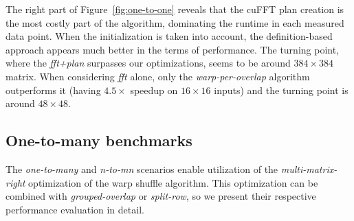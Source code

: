 

The right part of Figure~\ref{fig:one-to-one} reveals that the cuFFT plan creation is the most costly part of the algorithm, dominating the runtime in each measured data point. When the initialization is taken into account, the definition-based approach appears much better in the terms of performance. The turning point, where the \emph{fft+plan} surpasses our optimizations, seems to be around $384\times 384$ matrix. When considering \emph{fft} alone, only the \emph{warp-per-overlap} algorithm outperforms it (having $4.5\times$ speedup on $16\times 16$ inputs) and the turning point is around $48\times 48$.


\subsection{One-to-many benchmarks}

The \emph{one-to-many} and \emph{n-to-mn} scenarios enable utilization of the \emph{multi-matrix-right} optimization of the warp shuffle algorithm. This optimization can be combined with \emph{grouped-overlap} or \emph{split-row}, so we present their respective performance evaluation in detail.


